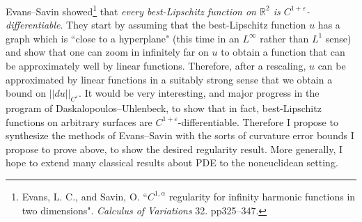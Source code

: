 \documentclass[12pt]{article}
\begin{document}
Evans--Savin showed\footnote{Evans, L. C., and Savin, O. ``$C^{1, \alpha}$ regularity for infinity harmonic functions in two dimensions". \emph{Calculus of Variations} 32. pp325--347.} that \emph{every best-Lipschitz function on $\mathbb R^2$ is $C^{1+\varepsilon}$-differentiable}.
They start by assuming that the best-Lipschitz function $u$ has a graph which is ``close to a hyperplane" (this time in an $L^\infty$ rather than $L^1$ sense) and show that one can zoom in infinitely far on $u$ to obtain a function that can be approximately well by linear functions.
Therefore, after a rescaling, $u$ can be approximated by linear functions in a suitably strong sense that we obtain a bound on $||du||_{C^\varepsilon}$.
It would be very interesting, and major progress in the program of Daskalopoulos--Uhlenbeck, to show that in fact, best-Lipschitz functions on arbitrary surfaces are $C^{1+\varepsilon}$-differentiable.
Therefore I propose to synthesize the methods of Evans--Savin with the sorts of curvature error bounds I propose to prove above, to show the desired regularity result.
More generally, I hope to extend many classical results about PDE to the noneuclidean setting.



\footnotesize
%
%
\printbibliography
\end{document}
